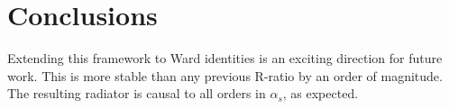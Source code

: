 \section{Conclusions}\label{sec:conclusions}

Extending this framework to Ward identities is an exciting direction for
future work. This is more stable than any previous R-ratio by an order
of magnitude. The resulting radiator is causal to all orders in
$\alpha_s$, as expected.


